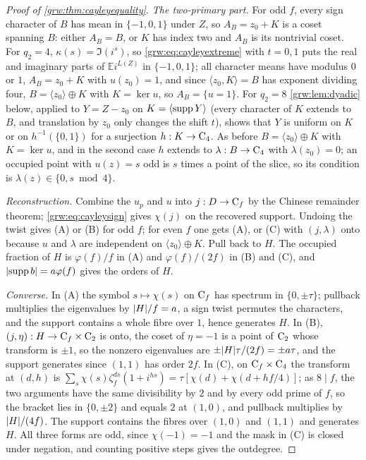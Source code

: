 \begin{proof}[Proof of \cref{grw:thm:cayleyequality}]
\emph{The two-primary part.} For odd $f$, every sign character of $B$
has mean in $\{-1,0,1\}$ under $Z$, so $A_B=z_0+K$ is a coset spanning $B$:
either $A_B=B$, or $K$ has index two and $A_B$ is its nontrivial coset.
For $q_2=4$, $\kappa(s)=\Im(i^s)$, so \eqref{grw:eq:cayleyextreme} with
$t=0,1$ puts the real and imaginary parts of $\mathbb Ei^{L(Z)}$ in
$\{-1,0,1\}$; all character means have modulus $0$ or $1$, $A_B=z_0+K$
with $u(z_0)=1$, and since $\langle z_0,K\rangle=B$ has exponent dividing
four, $B=\langle z_0\rangle\oplus K$ with $K=\ker u$, so $A_B=\{u=1\}$.
For $q_2=8$ \cref{grw:lem:dyadic} below, applied to $Y=Z-z_0$ on
$K=\langle\operatorname{supp} Y\rangle$ (every character of $K$ extends to $B$, and
translation by $z_0$ only changes the shift $t$), shows that $Y$ is uniform on $K$ or on
$h^{-1}(\{0,1\})$ for a surjection $h:K\to\mathrm{C}_4$. As before
$B=\langle z_0\rangle\oplus K$ with $K=\ker u$, and in the second case
$h$ extends to $\lambda:B\to\mathrm{C}_4$ with $\lambda(z_0)=0$; an occupied
point with $u(z)=s$ odd is $s$ times a point of the slice, so its
condition is $\lambda(z)\in\{0,s\bmod4\}$.

\emph{Reconstruction.} Combine the $u_p$ and $u$ into $j:D\to\mathrm{C}_f$
by the Chinese remainder theorem; \eqref{grw:eq:cayleysign} gives
$\chi(j)$ on the recovered support. Undoing the twist gives (A) or (B)
for odd $f$; for even $f$ one gets (A), or (C) with $(j,\lambda)$ onto
because $u$ and $\lambda$ are independent on $\langle z_0\rangle\oplus K$.
Pull back to $H$. The occupied fraction of $H$ is $\varphi(f)/f$ in (A)
and $\varphi(f)/(2f)$ in (B) and (C), and $\lvert\operatorname{supp} b\rvert=a\varphi(f)$
gives the orders of $H$.

\emph{Converse.} In (A) the symbol $s\mapsto\chi(s)$ on $\mathrm{C}_f$ has
spectrum in $\{0,\pm\tau\}$; pullback multiplies the eigenvalues by
$\lvert H\rvert/f=a$, a sign twist permutes the characters, and the support
contains a whole fibre over $1$, hence generates $H$. In (B),
$(j,\eta):H\to\mathrm{C}_f\times\mathrm{C}_2$ is onto, the coset of $\eta=-1$
is a point of $\mathrm{C}_2$ whose transform is $\pm1$, so the nonzero
eigenvalues are $\pm\lvert H\rvert\tau/(2f)=\pm a\tau$, and the support generates
since $(1,1)$ has order $2f$. In (C), on $\mathrm{C}_f\times\mathrm{C}_4$ the
transform at $(d,h)$ is
$\sum_s\chi(s)\zeta_f^{ds}(1+i^{hs})=\tau[\chi(d)+\chi(d+hf/4)]$; as
$8\mid f$, the two arguments have the same divisibility by $2$ and by
every odd prime of $f$, so the bracket lies in $\{0,\pm2\}$ and equals $2$
at $(1,0)$, and pullback multiplies by $\lvert H\rvert/(4f)$. The support contains
the fibres over $(1,0)$ and $(1,1)$ and generates $H$. All three forms are
odd, since $\chi(-1)=-1$ and the mask in (C) is closed under negation, and
counting positive steps gives the outdegree.
\end{proof}

